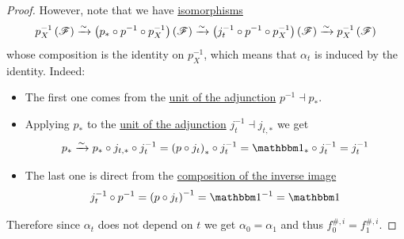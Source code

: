 \documentclass[../../main]{subfiles}
\begin{document}
\begin{proof}
  However, note that we have \hyperref[def:categorical-isomorphism]{isomorphisms}
  \begin{equation*}
    p_{X}^{-1} \left( \mathscr{F} \right) \xrightarrow{\sim} \left( p_{\ast} \circ p^{-1} \circ p_{X}^{-1} \right) \left( \mathscr{F} \right) \xrightarrow{\sim} \left( j_{t}^{-1} \circ p^{-1} \circ p_{X}^{-1} \right) \left( \mathscr{F} \right) \xrightarrow{\sim} p_{X}^{-1} \left( \mathscr{F} \right)
  \end{equation*}
  whose composition is the identity on \(p_{X}^{-1}\), which means that \(\alpha_{t}\) is induced by the identity.
  Indeed:
  \begin{itemize}
    \item The first one comes from the \hyperref[def:unit-counit]{unit of the adjunction} \hyperref[thm:direct-inverse-image-adjunction-sheaf]{\(p^{-1} \dashv p_{\ast}\)}.
    \item Applying \(p_{\ast}\) to the \hyperref[def:unit-counit]{unit of the adjunction} \hyperref[thm:direct-inverse-image-adjunction-sheaf]{\(j_{t}^{-1} \dashv j_{t, \ast}\)} we get
          \begin{equation*}
            p_{\ast} \isoarrow p_{\ast} \circ j_{t, \ast} \circ j_{t}^{-1} = \left( p \circ j_{t} \right)_{\ast} \circ j_{t}^{-1} = \id_{\ast} \circ j_{t}^{-1} = j_{t}^{-1}
          \end{equation*}
    \item The last one is direct from the \hyperref[lemma:composition-inverse-image-sheaf]{composition of the inverse image}
          \begin{equation*}
            j_{t}^{-1} \circ p^{-1} = \left( p \circ j_{t} \right)^{-1} = \id^{-1} = \id
          \end{equation*}
  \end{itemize}

  Therefore since \(\alpha_{t}\) does not depend on \(t\) we get \(\alpha_{0} = \alpha_{1}\) and thus \(f_{0}^{\#, i} = f_{1}^{\#, i}\).
\end{proof}
\end{document}

